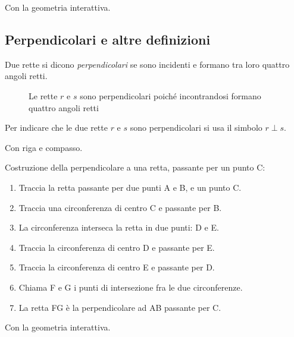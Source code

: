 \ifcoding
Con la geometria interattiva.


\fi

\subsection{Perpendicolari e altre definizioni}

\begin{definizione}
Due rette si dicono \emph{perpendicolari} se sono incidenti e formano 
tra loro quattro angoli retti.
\end{definizione}


\begin{inaccessibleblock}
 \begin{figure}[htb]
\centering
\caption{Le rette $r$ e $s$ sono perpendicolari poiché incontrandosi 
formano quattro angoli retti}
\end{figure}
\end{inaccessibleblock}

Per indicare che le due rette $r$ e $s$ sono perpendicolari si usa il 
simbolo $r\perp s$.

Con riga e compasso.

\begin{procedura}[Perpendicolare]\label{proc:fonda_perpendicolare}
  Costruzione della perpendicolare a una retta, passante per un punto C:
  \begin{enumerate} [nosep]
    \item 
    Traccia la retta passante per due punti A e B, e un punto C.
    \item 
    Traccia una circonferenza di centro C e passante per B. 
    \item 
    La circonferenza interseca la retta in due punti: D e E.
    \item 
    Traccia la circonferenza di centro D e passante per E.
    \item 
    Traccia la circonferenza di centro E e passante per D.
    \item 
    Chiama F e G i punti di intersezione fra le due circonferenze.
    \item 
    La retta FG è la perpendicolare ad AB passante per C.
  \end{enumerate}
\end{procedura}

\ifcoding
Con la geometria interattiva.

